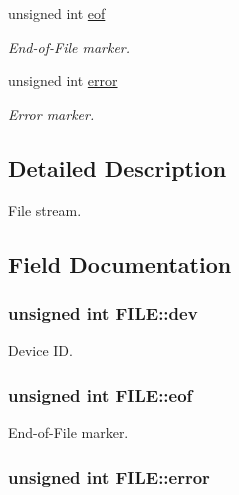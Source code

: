 \begin{DoxyCompactItemize}
unsigned int \hyperlink{structFILE_a0cb84690a663b39c7a870e6946b163c6}{eof}
\begin{DoxyCompactList}\small\item\em End-\/of-\/\+File marker. \end{DoxyCompactList}\item 
unsigned int \hyperlink{structFILE_a175509e10e7b35406f98d4a818879e8a}{error}
\begin{DoxyCompactList}\small\item\em Error marker. \end{DoxyCompactList}\end{DoxyCompactItemize}


\subsection{Detailed Description}
File stream. 

\subsection{Field Documentation}
\hypertarget{structFILE_ae0766e84f084e6297ae04c869bd06974}{}
\subsubsection[{dev}]{\setlength{\rightskip}{0pt plus 5cm}unsigned int F\+I\+L\+E\+::dev}\label{structFILE_ae0766e84f084e6297ae04c869bd06974}


Device I\+D. 

\hypertarget{structFILE_a0cb84690a663b39c7a870e6946b163c6}{}
\subsubsection[{eof}]{\setlength{\rightskip}{0pt plus 5cm}unsigned int F\+I\+L\+E\+::eof}\label{structFILE_a0cb84690a663b39c7a870e6946b163c6}


End-\/of-\/\+File marker. 

\hypertarget{structFILE_a175509e10e7b35406f98d4a818879e8a}{}
\subsubsection[{error}]{\setlength{\rightskip}{0pt plus 5cm}unsigned int F\+I\+L\+E\+::error}\label{structFILE_a175509e10e7b35406f98d4a818879e8a}


